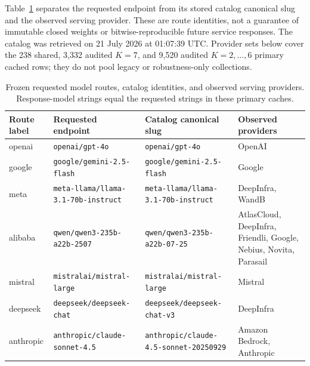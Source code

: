 Table~\ref{tab:repro-routes} separates the requested endpoint from its
stored catalog canonical slug and the observed serving provider. These
are route identities, not a guarantee of immutable closed weights or
bitwise-reproducible future service responses. The catalog was retrieved
on 21 July 2026 at 01:07:39 UTC. Provider sets below cover the 238 shared,
3,332 audited $K=7$, and 9,520 audited $K=2,\ldots,6$ primary cached rows;
they do not pool legacy or robustness-only collections.
\begin{table}[t]
\caption{Frozen requested model routes, catalog identities, and observed serving providers. Response-model strings equal the requested strings in these primary caches.}
\label{tab:repro-routes}
\small
\begin{tabular}{@{}p{}p{}p{}p{}@{}}
\toprule
Route label & Requested endpoint & Catalog canonical slug & Observed providers \\
\midrule
openai & \texttt{openai/\allowbreak{}gpt-\allowbreak{}4o} & \texttt{openai/\allowbreak{}gpt-\allowbreak{}4o} & OpenAI \\
google & \texttt{google/\allowbreak{}gemini-\allowbreak{}2.\allowbreak{}5-\allowbreak{}flash} & \texttt{google/\allowbreak{}gemini-\allowbreak{}2.\allowbreak{}5-\allowbreak{}flash} & Google \\
meta & \texttt{meta-\allowbreak{}llama/\allowbreak{}llama-\allowbreak{}3.\allowbreak{}1-\allowbreak{}70b-\allowbreak{}instruct} & \texttt{meta-\allowbreak{}llama/\allowbreak{}llama-\allowbreak{}3.\allowbreak{}1-\allowbreak{}70b-\allowbreak{}instruct} & DeepInfra, WandB \\
alibaba & \texttt{qwen/\allowbreak{}qwen3-\allowbreak{}235b-\allowbreak{}a22b-\allowbreak{}2507} & \texttt{qwen/\allowbreak{}qwen3-\allowbreak{}235b-\allowbreak{}a22b-\allowbreak{}07-\allowbreak{}25} & AtlasCloud, DeepInfra, Friendli, Google, Nebius, Novita, Parasail \\
mistral & \texttt{mistralai/\allowbreak{}mistral-\allowbreak{}large} & \texttt{mistralai/\allowbreak{}mistral-\allowbreak{}large} & Mistral \\
deepseek & \texttt{deepseek/\allowbreak{}deepseek-\allowbreak{}chat} & \texttt{deepseek/\allowbreak{}deepseek-\allowbreak{}chat-\allowbreak{}v3} & DeepInfra \\
anthropic & \texttt{anthropic/\allowbreak{}claude-\allowbreak{}sonnet-\allowbreak{}4.\allowbreak{}5} & \texttt{anthropic/\allowbreak{}claude-\allowbreak{}4.\allowbreak{}5-\allowbreak{}sonnet-\allowbreak{}20250929} & Amazon Bedrock, Anthropic \\
\bottomrule
\end{tabular}
\end{table}

